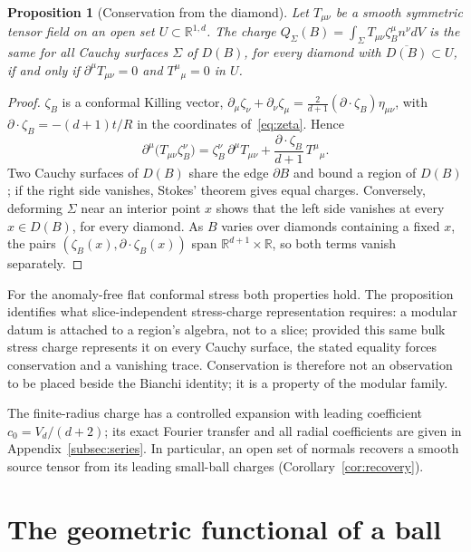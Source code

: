 \documentclass[12pt]{article}
\newtheorem{proposition}[theorem]{Proposition}
\theoremstyle{definition}
\theoremstyle{remark}
\begin{document}
\begin{proposition}[Conservation from the diamond]\label{prop:conservation}
Let \(T_{\mu\nu}\) be a smooth symmetric tensor field on an open set
\(U\subset\mathbb R^{1,d}\). The charge \(Q_\Sigma(B)=\int_\Sigma T_{\mu\nu}\zeta_B^\mu n^\nu
dV\) is the same for all Cauchy surfaces \(\Sigma\) of \(D(B)\), for every diamond with
\(\overline{D(B)}\subset U\), if and only if \(\partial^\mu T_{\mu\nu}=0\) and
\(T^\mu{}_\mu=0\) in \(U\).
\end{proposition}

\begin{proof}
\(\zeta_B\) is a conformal Killing vector,
\(\partial_\mu\zeta_\nu+\partial_\nu\zeta_\mu=\frac{2}{d+1}(\partial\cdot\zeta_B)\eta_{\mu\nu}\),
with \(\partial\cdot\zeta_B=-(d+1)t/R\) in the coordinates of~\eqref{eq:zeta}. Hence
\[
\partial^\mu\big(T_{\mu\nu}\zeta_B^\nu\big)
=\zeta_B^\nu\,\partial^\mu T_{\mu\nu}+\frac{\partial\cdot\zeta_B}{d+1}\,T^\mu{}_\mu .
\]
Two Cauchy surfaces of \(D(B)\) share the edge \(\partial B\) and bound a region of
\(D(B)\); if the right side vanishes, Stokes' theorem gives equal charges. Conversely,
deforming \(\Sigma\) near an interior point \(x\) shows that the left side vanishes at
every \(x\in D(B)\), for every diamond. As \(B\) varies over diamonds containing a fixed
\(x\), the pairs \((\zeta_B(x),\partial\cdot\zeta_B(x))\) span
\(\mathbb R^{d+1}\times\mathbb R\), so both terms vanish separately.
\end{proof}

For the anomaly-free flat conformal stress both properties hold.
The proposition identifies what slice-independent stress-charge representation requires: a modular datum is attached to a region's algebra, not
to a slice; provided this same bulk stress charge represents it on every
Cauchy surface, the stated equality forces conservation and a vanishing trace. Conservation is therefore not an observation to be placed beside the Bianchi
identity; it is a property of the modular family.

The finite-radius charge has a controlled expansion with leading
coefficient $c_0=V_d/(d+2)$; its exact Fourier transfer and all radial
coefficients are given in Appendix~\ref{subsec:series}. In particular,
an open set of normals recovers a smooth source tensor from its leading
small-ball charges (Corollary~\ref{cor:recovery}).

\section{The geometric functional of a ball}\label{sec:functional}
\end{document}
